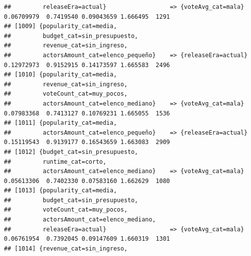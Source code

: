 \documentclass[
]{article}
\begin{document}
\begin{verbatim}
##         releaseEra=actual}                  => {voteAvg_cat=mala}                0.06709979  0.7419540 0.09043659 1.666495  1291
## [1009] {popularity_cat=media,                                                                                                   
##         budget_cat=sin_presupuesto,                                                                                             
##         revenue_cat=sin_ingreso,                                                                                                
##         actorsAmount_cat=elenco_pequeño}    => {releaseEra=actual}               0.12972973  0.9152915 0.14173597 1.665583  2496
## [1010] {popularity_cat=media,                                                                                                   
##         revenue_cat=sin_ingreso,                                                                                                
##         voteCount_cat=muy_pocos,                                                                                                
##         actorsAmount_cat=elenco_mediano}    => {voteAvg_cat=mala}                0.07983368  0.7413127 0.10769231 1.665055  1536
## [1011] {popularity_cat=media,                                                                                                   
##         actorsAmount_cat=elenco_pequeño}    => {releaseEra=actual}               0.15119543  0.9139177 0.16543659 1.663083  2909
## [1012] {budget_cat=sin_presupuesto,                                                                                             
##         runtime_cat=corto,                                                                                                      
##         actorsAmount_cat=elenco_mediano}    => {voteAvg_cat=mala}                0.05613306  0.7402330 0.07583160 1.662629  1080
## [1013] {popularity_cat=media,                                                                                                   
##         budget_cat=sin_presupuesto,                                                                                             
##         voteCount_cat=muy_pocos,                                                                                                
##         actorsAmount_cat=elenco_mediano,                                                                                        
##         releaseEra=actual}                  => {voteAvg_cat=mala}                0.06761954  0.7392045 0.09147609 1.660319  1301
## [1014] {revenue_cat=sin_ingreso,                                                                                                

\end{verbatim}
\end{document}
